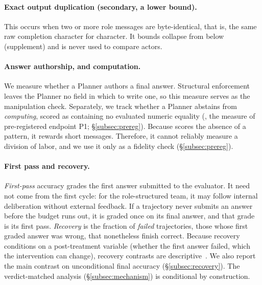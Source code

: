 \paragraph{Exact output duplication (secondary, a lower bound).} This occurs
when two or more role messages are byte-identical, that is, the same raw
completion character for character. It
bounds collapse from below (supplement) and is never used to compare actors.

\paragraph{Answer authorship, and computation.} We measure whether a Planner
authors a final answer. Structural enforcement leaves the Planner no field
in which to write one, so this measure serves as the manipulation check.
Separately, we track whether a Planner abstains from \emph{computing},
scored as containing no evaluated numeric equality (\textbf{\Pone{}}, the
measure of pre-registered endpoint P1; \S\ref{subsec:prereg}). Because \Pone{} scores the absence of a pattern, it rewards
short messages. Therefore, it cannot reliably measure a division of labor,
and we use it only as a fidelity check (\S\ref{subsec:prereg}).

\paragraph{First pass and recovery.} \emph{First-pass} accuracy grades the
first answer submitted to the evaluator. It need not come from the first
cycle: for the role-structured team, it may follow internal deliberation
without external feedback. If a trajectory never submits an answer before the budget
runs out, it is graded once on its final answer, and that grade is its first
pass. \emph{Recovery} is the fraction of \emph{failed} trajectories, those
whose first graded answer was wrong, that nonetheless finish correct.
Because recovery conditions on a post-treatment variable (whether the first
answer failed, which the intervention can change), recovery contrasts are
descriptive~\cite{montgomery2018conditioning}. We also report the
main contrast on unconditional final accuracy
(\S\ref{subsec:recovery}). The verdict-matched analysis
(\S\ref{subsec:mechanism}) is conditional by construction.
